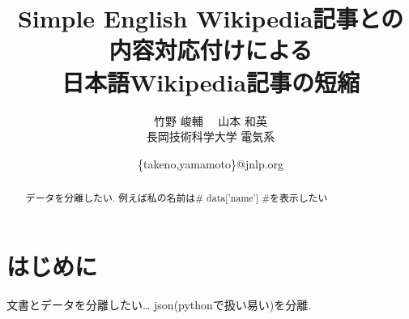 \documentclass[twocolumn,uplatex]{jsarticle}
\begin{document}
\title{Simple English Wikipedia記事との内容対応付けによる\\日本語Wikipedia記事の短縮} 
\author{
    竹野 峻輔 \, \, 山本 和英
    \\ 長岡技術科学大学 電気系
}
\date{\{takeno,yamamoto\}@jnlp.org} 
\maketitle
\begin{abstract}
    データを分離したい.
    例えば私の名前は{# data['name'] #}を表示したい
\end{abstract}


\section{はじめに}
文書とデータを分離したい…
json(pythonで扱い易い)を分離.
\end{document}
